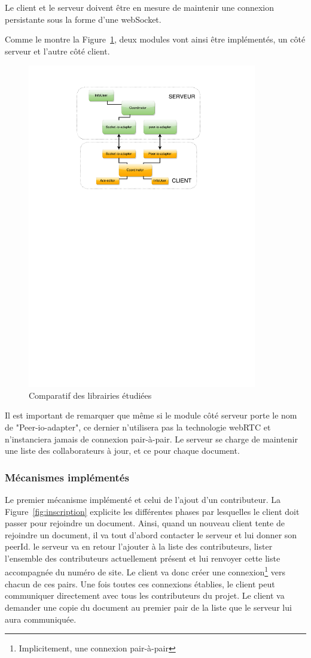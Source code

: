 \documentclass{tnreport}
\begin{document}
Le client et le serveur doivent être en mesure de maintenir une connexion persistante sous la forme d'une webSocket.

Comme le montre la Figure~\ref{fig:archi-p2p}, deux modules vont ainsi être implémentés, un côté serveur et l'autre côté client.

\begin{figure}[!h]
  \centering
  \includegraphics[width=10cm]{figures/archi-p2p}
  \caption{Comparatif des librairies étudiées}
  \label{fig:archi-p2p}
\end{figure}

Il est important de remarquer que même si le module côté serveur porte le nom de "Peer-io-adapter", ce dernier n'utilisera pas la technologie webRTC et n'instanciera jamais de connexion pair-à-pair. Le serveur se charge de maintenir une liste des collaborateurs à jour, et ce pour chaque document. 

\subsubsection{Mécanismes implémentés}

Le premier mécanisme implémenté et celui de l'ajout d'un contributeur. La Figure~\ref{fig:inscription} explicite les différentes phases par lesquelles le client doit passer pour rejoindre un document. Ainsi, quand un nouveau client tente de rejoindre un document, il va tout d'abord contacter le serveur et lui donner son peerId. le serveur va en retour l'ajouter à la liste des contributeurs, lister l'ensemble des contributeurs actuellement présent et lui renvoyer cette liste accompagnée du numéro de site. Le client va donc créer une connexion\footnote{Implicitement, une connexion pair-à-pair} vers chacun de ces pairs. Une fois toutes ces connexions établies, le client peut communiquer directement avec tous les contributeurs du projet. Le client va demander une copie du document au premier pair de la liste que le serveur lui aura communiquée.
\end{document}
